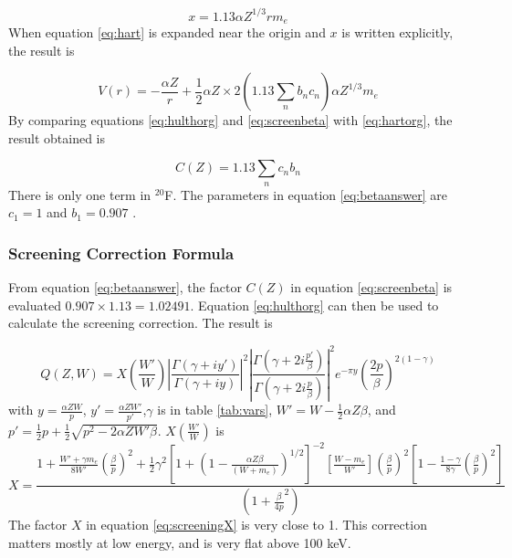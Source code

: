 \documentclass[../MaxHughesThesis.tex]{subfiles}
\begin{document}
\begin{equation}
	x = 1.13 \alpha Z^{1/3} r m_{e}
	\label{eq:screeningx}
\end{equation}
When equation \ref{eq:hart} is expanded near the origin and $x$ is written explicitly, the result is %

\begin{equation}
	V(r) = - \frac{\alpha Z}{r} + \frac{1}{2} \alpha Z \times 2 (1.13 \sum_{n} b_{n} c_{n}) \alpha Z^{1/3} m_{e} 
	\label{eq:hartorg}
\end{equation}
By comparing equations \ref{eq:hulthorg} and \ref{eq:screenbeta} with \ref{eq:hartorg}, the result obtained is %

\begin{equation}
	C(Z) = 1.13 \sum_{n} c_{n} b_{n}
	\label{eq:betaanswer}
\end{equation} 
There is only one term in $^{20}$F. 
The parameters in equation \ref{eq:betaanswer} are $c_{1} = 1$ and $b_{1} = 0.907$ \cite{Bya56}.

\subsubsection{Screening Correction Formula}
From equation \ref{eq:betaanswer}, the factor $C(Z)$ in equation \ref{eq:screenbeta} is evaluated $0.907 \times 1.13 = 1.02491$.
Equation \ref{eq:hulthorg} can then be used to calculate the screening correction.
The result is \cite{Buh84} %

\begin{equation}
	Q(Z,W) = X(\frac{W'}{W}) \left|\frac{\Gamma(\gamma + i y')}{\Gamma(\gamma+ i y)}\right|^{2} \left|\frac{\Gamma(\gamma + 2 i \frac{p'}{\beta})}{\Gamma(\gamma + 2 i \frac{p}{\beta})}\right|^{2}e^{-\pi y}(\frac{2p}{\beta})^{2(1 - \gamma)}
	\label{eq:screeningQ}
\end{equation}
with $y = \frac{\alpha Z W}{p}$, $y' = \frac{\alpha Z W'}{p'}$,$ \gamma$ is in table \ref{tab:vars}, $W' = W - \frac{1}{2}\alpha Z \beta$, and $p' = \frac{1}{2}p + \frac{1}{2}\sqrt{p^{2} - 2 \alpha Z W' \beta}$.
$X(\frac{W'}{W})$ is %
\begin{equation}
	X = \frac{1 + \frac{W' + \gamma m_{e}}{8 W'} (\frac{\beta}{p})^{2} + \frac{1}{2}\gamma^{2}[1 + (1 - \frac{\alpha Z \beta}{(W + m_{e})})^{1/2}]^{-2} [\frac{W - m_{e}}{W'}] (\frac{\beta}{p})^{2}[1 - \frac{1 - \gamma}{8\gamma}(\frac{\beta}{p})^{2}]}{(1 + \frac{\beta}{4p}^{2})}
	\label{eq:screeningX}
\end{equation}
The factor $X$ in equation \ref{eq:screeningX} is very close to 1.
This correction matters mostly at low energy, and is very flat above 100 keV.
\end{document}
